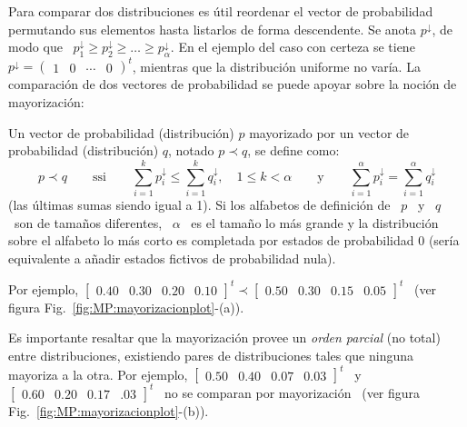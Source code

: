 Para comparar dos  distribuciones es \'util reordenar el  vector de probabilidad
permutando  sus  elementos  hasta  listarlos  de forma  descendente.   Se  anota
$p^\downarrow$, de modo que \  $p^\downarrow_1 \ge p^\downarrow_2 \ge \ldots \ge
p^\downarrow_\alpha$.  En  el ejemplo del caso  con certeza se  tiene \ $p^\downarrow
=  \begin{pmatrix}  1  & 0  &  \cdots  &  0  \end{pmatrix}^t$, mientras  que  la
distribuci\'on  uniforme  no  var\'ia.  La  comparaci\'on  de  dos  vectores  de
probabilidad se puede apoyar sobre la noci\'on de mayorizaci\'on:
%
\begin{definicion}[Mayorizaci\'on]\label{Def:MP:Mayorizacion}
  Un vector  de probabilidad  (distribuci\'on) $p$ mayorizado  por un  vector de
  probabilidad (distribuci\'on) $q$, notado $p \prec q$, se define como:
  \[
  p   \prec  q   \qquad  \mbox{ssi}   \qquad  \sum_{i=1}^k   p_i^\downarrow  \le
  \sum_{i=1}^k q_i^\downarrow,  \quad 1  \le k <  \alpha \qquad  \mbox{y} \qquad
  \sum_{i=1}^\alpha p_i^\downarrow = \sum_{i=1}^\alpha q_i^\downarrow
  \]
  (las \'ultimas sumas siendo igual a 1).  Si los alfabetos de definici\'on de \
  $p$ \ y  \ $q$ \ son de  tama\~nos diferentes, \ $\alpha$ \ es  el tama\~no lo
  m\'as  grande  y  la  distribuci\'on  sobre  el alfabeto  lo  m\'as  corto  es
  completada  por estados  de  probabilidad 0  (ser\'ia  equivalente a  a\~nadir
  estados fictivos de probabilidad nula).
\end{definicion}
%
\noindent   Por    ejemplo,   $\begin{bmatrix}   0.40   &   0.30    &   0.20   &
  0.10   \end{bmatrix}^t  \prec   \begin{bmatrix}   0.50  &   0.30   &  0.15   &
  0.05 \end{bmatrix}^t$ \ (ver figura Fig.~\ref{fig:MP:mayorizacionplot}-(a)).

Es importante resaltar  que la mayorizaci\'on provee un  {\em orden parcial} (no
total)  entre  distribuciones,  existiendo  pares de  distribuciones  tales  que
ninguna mayoriza a la otra.  Por  ejemplo, $\begin{bmatrix} 0.50 & 0.40 & 0.07 &
  0.03  \end{bmatrix}^t$  \   y  \  $\begin{bmatrix}  0.60  &   0.20  &  0.17  &
  .03  \end{bmatrix}^t$  \ no  se  comparan  por  mayorizaci\'on \  (ver  figura
Fig.~\ref{fig:MP:mayorizacionplot}-(b)).

